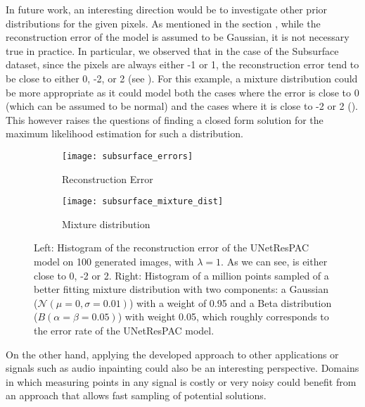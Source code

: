 In future work, an interesting direction would be to investigate other prior distributions for the given pixels. As mentioned in the section , while the reconstruction error of the model is assumed to be Gaussian, it is not necessary true in practice. In particular, we observed that in the case of the Subsurface dataset, since the pixels are always either -1 or 1, the reconstruction error tend to be close to either 0, -2, or 2 (see ). For this example, a mixture distribution could be more appropriate as it could model both the cases where the error is close to 0 (which can be assumed to be normal) and the cases where it is close to -2 or 2 ().  This however raises the questions of finding a closed form solution for the maximum likelihood estimation for such a distribution.

\begin{figure}
	
	\begin{subfigure}[t]{0.5\textwidth}
		\centering
		\texttt{[image: subsurface\_errors]}
		\caption{Reconstruction Error}
		\label{fig:rec_error}
	\end{subfigure}\begin{subfigure}[t]{0.5\textwidth}
		\centering
		\texttt{[image: subsurface\_mixture\_dist]}
		\caption{Mixture distribution}
		\label{fig:mixture_dist}
	\end{subfigure}	
	\caption[Better modeling of the reconstruction error on the Subsurface dataset]{Left: Histogram of the reconstruction error of the UNetResPAC model on 100 generated images, with $\lambda = 1$. As we can see, is either close to 0, -2 or 2. Right:  Histogram of a million points sampled of a better fitting mixture distribution with two components: a Gaussian ($\mathcal{N}(\mu=0,\sigma=0.01)$) with a weight of 0.95 and a Beta distribution ($B(\alpha=\beta=0.05)$) with weight 0.05, which roughly corresponds to the error rate of the UNetResPAC model.}
\end{figure}

On the other hand, applying the developed approach to other applications or signals such as audio inpainting \citep{Marafioti2018} could also be an interesting perspective. Domains in which measuring points in any signal is costly or very noisy could benefit from an approach that allows fast sampling of potential solutions.
